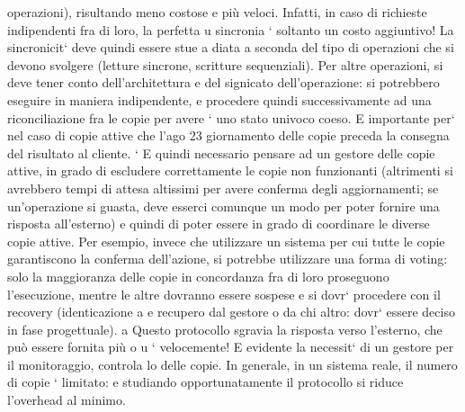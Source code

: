 \documentclass[a4paper,12pt]{article}
\begin{document}
operazioni), risultando meno costose
e più veloci. Infatti, in caso di richieste indipendenti fra di loro, la perfetta
u
sincronia ` soltanto un costo aggiuntivo! La sincronicit` deve quindi essere stue
a
diata a seconda del tipo di operazioni che si devono svolgere (letture sincrone,
scritture sequenziali). Per altre operazioni, si deve tener conto dell'architettura
e del signicato dell'operazione: si potrebbero eseguire in maniera indipendente,
e procedere quindi successivamente ad una riconciliazione fra le copie per avere
`
uno stato univoco coeso. E importante per` nel caso di copie attive che l'ago
23
giornamento delle copie preceda la consegna del risultato al cliente.
`
E quindi necessario pensare ad un gestore delle copie attive, in grado di escludere correttamente le copie non
funzionanti (altrimenti si avrebbero tempi
di attesa altissimi per avere conferma degli aggiornamenti; se un'operazione si
guasta, deve esserci comunque un modo per poter fornire una risposta all'esterno) e quindi di poter essere in grado di
coordinare le diverse copie attive. Per
esempio, invece che utilizzare un sistema per cui tutte le copie garantiscono la
conferma dell'azione, si potrebbe utilizzare una forma di voting: solo la maggioranza delle copie in concordanza fra di
loro proseguono l'esecuzione, mentre le
altre dovranno essere sospese e si dovr` procedere con il recovery (identicazione
a
e recupero dal gestore o da chi altro: dovr` essere deciso in fase progettuale).
a
Questo protocollo sgravia la risposta verso l'esterno, che può essere fornita più
o
u
`
velocemente! E evidente la necessit` di un gestore per il monitoraggio, controla
lo delle copie. In generale, in un sistema reale, il numero di copie ` limitato:
e
studiando opportunatamente il protocollo si riduce l'overhead al minimo.
\end{document}
